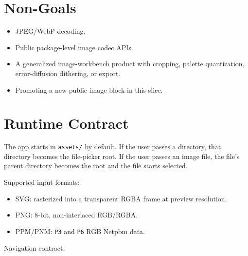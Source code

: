 \section{Non-Goals}\label{record-137-non-goals}

\begin{itemize}
\tightlist
\item
  JPEG/WebP decoding.
\item
  Public package-level image codec APIs.
\item
  A generalized image-workbench product with cropping, palette quantization, error-diffusion dithering, or export.
\item
  Promoting a new public image block in this slice.
\end{itemize}

\section{Runtime Contract}\label{record-137-runtime-contract}

The app starts in \texttt{a\allowbreak{}s\allowbreak{}s\allowbreak{}e\allowbreak{}t\allowbreak{}s\allowbreak{}/} by default. If the user passes a directory, that directory becomes the file-picker root. If the user passes an image file, the file's parent directory becomes the root and the file starts selected.

Supported input formats:

\begin{itemize}
\tightlist
\item
  SVG: rasterized into a transparent RGBA frame at preview resolution.
\item
  PNG: 8-bit, non-interlaced RGB/RGBA.
\item
  PPM/PNM: \texttt{P\allowbreak{}3} and \texttt{P\allowbreak{}6} RGB Netpbm data.
\end{itemize}

Navigation contract:

